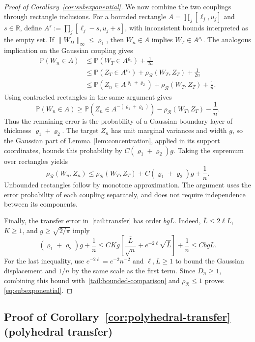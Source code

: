 \documentclass[11pt,letterpaper]{article}
\theoremstyle{remark}
\newcommand{\Pp}{\mathbb P}
\newcommand{\R}{\mathbb R}
\newcommand{\rh}{\rho_{\mathcal R}}
\begin{document}
\begin{proof}[Proof of Corollary~\ref{cor:subexponential}]
We now combine the two couplings through rectangle inclusions.
For a bounded rectangle $A=\prod_j[\ell_j,u_j]$ and $s\in\R$,
define $A^s:=\prod_j[\ell_j-s,u_j+s]$, with inconsistent bounds
interpreted as the empty set. If $\|W_D\|_\infty\le\varrho_1$,
then $W_n\in A$ implies $W_T\in A^{\varrho_1}$.
The analogous implication on the Gaussian coupling gives
\begin{align*}
 \Pp(W_n\in A)
 &\le\Pp(W_T\in A^{\varrho_1})+\frac1{2n}\\
 &\le\Pp(Z_T\in A^{\varrho_1})+\rh(W_T,Z_T)+\frac1{2n}\\
 &\le\Pp(Z_n\in A^{\varrho_1+\varrho_2})
                         +\rh(W_T,Z_T)+\frac1n.
\end{align*}
Using contracted rectangles in the same argument gives
\[
 \Pp(W_n\in A)
 \ge\Pp(Z_n\in A^{-(\varrho_1+\varrho_2)})
                         -\rh(W_T,Z_T)-\frac1n.
\]
Thus the remaining error is the probability of a Gaussian boundary
layer of thickness $\varrho_1+\varrho_2$.
The target $Z_n$ has unit marginal variances and width $g$, so the
Gaussian part of Lemma~\ref{lem:concentration}, applied in its support
coordinates, bounds this probability by $C(\varrho_1+\varrho_2)g$.
Taking the supremum over rectangles yields
\begin{equation}
 \rh(W_n,Z_n)\le\rh(W_T,Z_T)
       +C(\varrho_1+\varrho_2)g+\frac1n.
 \label{tail:transfer}
\end{equation}
Unbounded rectangles follow by monotone approximation. The argument
uses the error probability of each coupling separately, and does not
require independence between its components.

Finally, the transfer error in~\eqref{tail:transfer} has order $bgL$.
Indeed, $\bar L\le2\ell L$, $K\ge1$, and $g\ge\sqrt{2/\pi}$ imply
\[
 (\varrho_1+\varrho_2)g+\frac1n
 \le CKg\left[\frac{\bar L}{\sqrt n}
                   +e^{-2\ell}\sqrt{\bar L}\right]+\frac1n
 \le CbgL.
\]
For the last inequality, use $e^{-2\ell}=e^{-2}n^{-2}$ and
$\ell,L\ge1$ to bound the Gaussian displacement and $1/n$ by the
same scale as the first term. Since $D_n\ge1$, combining this bound
with~\eqref{tail:bounded-comparison} and $\rh\le1$ proves
\eqref{eq:subexponential}.
\end{proof}

\subsection{Proof of Corollary~\ref*{cor:polyhedral-transfer} (polyhedral transfer)}
\label{app:polyhedral-transfer}
\end{document}
